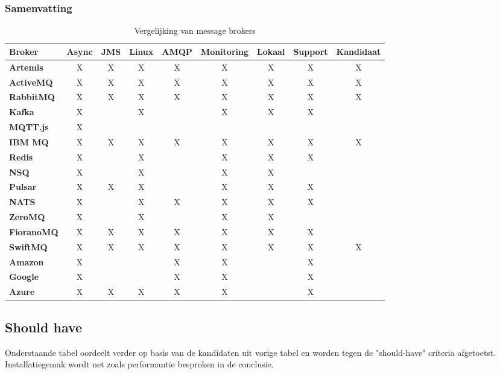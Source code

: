 \subsubsection{Samenvatting}
\begin{table}[h!]
  \centering
  \footnotesize
\begin{tabular}{|l|c|c|c|c|c|c|c|c|}
  \hline
  \textbf{Broker} & \textbf{Async} & \textbf{JMS} & \textbf{Linux} & \textbf{AMQP} & \textbf{Monitoring} & \textbf{Lokaal} & \textbf{Support} & \textbf{Kandidaat}\\ \hline
  \textbf{Artemis}   & X & X & X & X & X & X & X & X \\ \hline
  \textbf{ActiveMQ}  & X & X & X & X & X & X & X & X \\ \hline
  \textbf{RabbitMQ}  & X & X & X & X & X & X & X & X \\ \hline
  \textbf{Kafka}     & X &   & X &   & X & X & X &   \\ \hline
  \textbf{MQTT.js}   & X &   &   &   &   &   &   &   \\ \hline
  \textbf{IBM MQ}    & X & X & X & X & X & X & X & X \\ \hline
  \textbf{Redis}     & X &   & X &   & X & X & X &   \\ \hline
  \textbf{NSQ}       & X &   & X &   & X & X &   &   \\ \hline
  \textbf{Pulsar}    & X & X & X &   & X & X & X &   \\ \hline
  \textbf{NATS}      & X &   & X & X & X & X & X &   \\ \hline
  \textbf{ZeroMQ}    & X &   & X &   & X & X &   &   \\ \hline
  \textbf{FioranoMQ} & X & X & X & X & X & X & X &   \\ \hline
  \textbf{SwiftMQ}   & X & X & X & X & X & X & X & X \\ \hline
  \textbf{Amazon}    & X &   &   & X & X &   & X &   \\ \hline
  \textbf{Google}    & X &   &   & X & X &   & X &   \\ \hline
  \textbf{Azure}     & X & X & X & X & X &   & X &   \\ \hline
\end{tabular}
\caption{Vergelijking van message brokers}
\label{tab:vergelijking_message_brokers_must_have}
\end{table}


\newpage
\subsection{Should have} 
Onderstaande tabel oordeelt verder op basis van de kandidaten uit vorige tabel en worden tegen de "should-have" criteria afgetoetst.
Installatiegemak wordt net zoals performantie besproken in de conclusie.

